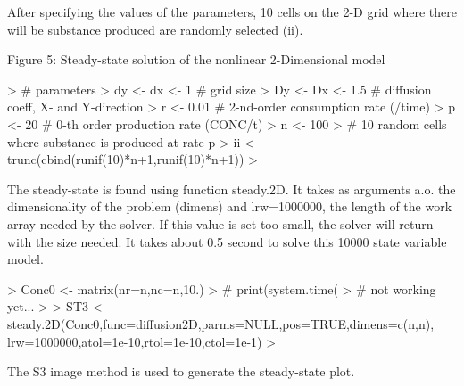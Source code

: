 \documentclass{article}
\begin{document}
After specifying the values of the parameters, 10 cells on the 2-D grid where there will be
substance produced are randomly selected (ii).


Figure 5: Steady-state solution of the nonlinear 2-Dimensional model

\begin{Schunk}
\begin{Sinput}
> # parameters
> dy <- dx <- 1 # grid size
> Dy <- Dx <- 1.5 # diffusion coeff, X- and Y-direction
> r <- 0.01 # 2-nd-order consumption rate (/time)
> p <- 20 # 0-th order production rate (CONC/t)
> n <- 100
> # 10 random cells where substance is produced at rate p
> ii <- trunc(cbind(runif(10)*n+1,runif(10)*n+1))
> 
\end{Sinput}
\end{Schunk}
The steady-state is found using function steady.2D. It takes as arguments a.o. the dimensionality
of the problem (dimens) and lrw=1000000, the length of the work array needed by
the solver. If this value is set too small, the solver will return with the size needed.
It takes about 0.5 second to solve this 10000 state variable model.

\begin{Schunk}
\begin{Sinput}
> Conc0 <- matrix(nr=n,nc=n,10.)
> # print(system.time(
> # not working yet...
> 
> ST3 <- steady.2D(Conc0,func=diffusion2D,parms=NULL,pos=TRUE,dimens=c(n,n), lrw=1000000,atol=1e-10,rtol=1e-10,ctol=1e-1)
> 
\end{Sinput}
\end{Schunk}


The S3 image method is used to generate the steady-state plot.
\end{document}
